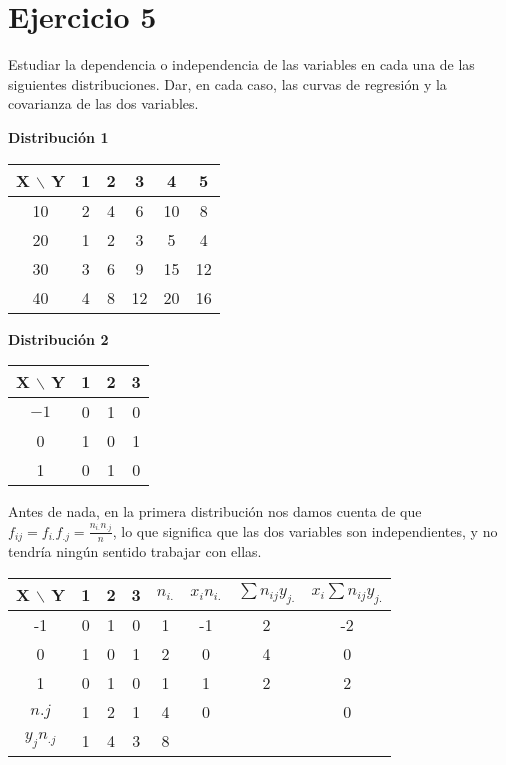 \documentclass[a4paper,12pt]{article}
\begin{document}
\section*{Ejercicio 5}
Estudiar la dependencia o independencia de las variables en cada una de las siguientes distribuciones. Dar, en cada caso, las curvas de regresi\'on y la covarianza de las dos variables.

\textbf{Distribuci\'on 1}
\begin{center}
\begin{tabular}{c|ccccc}
X $\backslash$ Y & 1 & 2 & 3 & 4 & 5 \\
\hline
10 & 2 & 4 & 6 & 10 & 8 \\
20 & 1 & 2 & 3 & 5 & 4 \\
30 & 3 & 6 & 9 & 15 & 12 \\
40 & 4 & 8 & 12 & 20 & 16 \\
\end{tabular}
\end{center}

\textbf{Distribuci\'on 2}
\begin{center}
\begin{tabular}{c|ccc}
X $\backslash$ Y & 1 & 2 & 3 \\
\hline
$-1$ & 0 & 1 & 0 \\
0 & 1 & 0 & 1 \\
1 & 0 & 1 & 0 \\
\end{tabular}
\end{center}

Antes de nada, en la primera distribución nos damos cuenta de que $f_{ij}=f_{i.}f_{.j}=\frac{n_{i.}n_{.j}}{n}$, lo que significa que las dos variables son independientes, y no tendría ningún sentido trabajar con ellas.\\

\begin{center}
\begin{tabular}{c|ccc|c||c|c|c}
X $\backslash$ Y & 1 & 2 & 3 & $n_{i.}$ & $x_in_{i.}$ & $\sum n_{ij} y_{j.}$ & $x_i\sum n_{ij} y_{j.}$ \\
\hline
-1 & 0 & 1 & 0 & 1 & -1 & 2 & -2 \\
0 & 1 & 0 & 1 & 2 & 0 & 4 & 0\\
1 & 0 & 1 & 0 & 1 & 1 & 2 & 2\\
\hline
$n{.j}$ & 1 & 2 &  1 & 4 & 0 & & 0\\
\hline
$y_jn_{.j}$ & 1 & 4 & 3 & 8 & &\\
\end{tabular}
\end{center}
\end{document}

